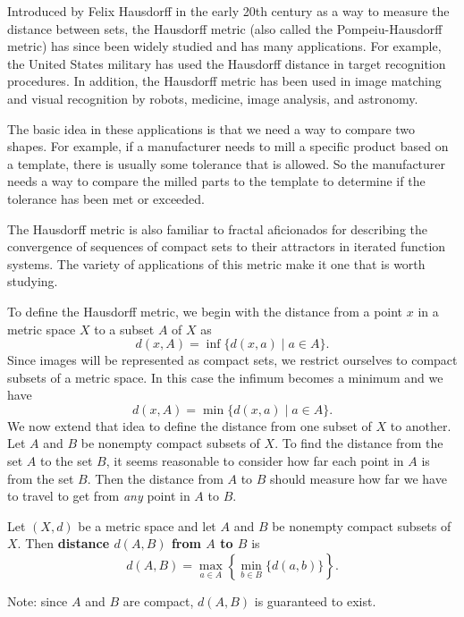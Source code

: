 \ee


Introduced by Felix Hausdorff in the early 20th century as a way to measure the distance between sets, the Hausdorff metric  (also called the Pompeiu-Hausdorff metric) has since been widely studied and has many applications. For example, the United States military has used the Hausdorff distance in target recognition procedures. In addition, the Hausdorff metric has been used in image matching and visual recognition by robots, medicine, image analysis, and astronomy.

The basic idea in these applications is that we need a way to compare two shapes. For example, if a manufacturer needs to mill a specific product based on a template, there is usually some tolerance that is allowed. So the manufacturer needs a way to compare the milled parts to the template to determine if the tolerance has been met or exceeded.  
 
The Hausdorff metric is also familiar to fractal aficionados for describing the convergence of sequences of compact sets to their attractors in iterated function systems. The variety of applications of this metric make it one that is worth studying. 

To define the Hausdorff metric, we begin with the distance from a point $x$ in a metric space $X$ to a subset $A$ of $X$ as 
\[d(x,A) = \inf\{d(x,a) \mid a \in A\}.\]
Since images will be represented as compact sets, we restrict ourselves to compact subsets of a metric space. In this case the infimum becomes a minimum and we have 
\[d(x,A) = \min\{d(x,a) \mid a \in A\}.\]
We now extend that idea to define the distance from one subset of $X$ to another. Let $A$ and $B$ be nonempty compact subsets of $X$. To find the distance from the set $A$ to the set $B$, it seems reasonable to consider how far each point in $A$ is from the set $B$. Then the distance from $A$ to $B$ should measure how far we have to travel to get from \emph{any} point in $A$ to $B$. 


\begin{definition} \label{def:AtoB} Let $(X,d)$ be a metric space and let $A$ and $B$ be nonempty compact subsets of $X$. Then \textbf{distance $d(A,B)$ from $A$ to $B$} is 
\[d(A,B) = \max_{a \in A} \left\{ \min_{b \in B} \{d(a,b)\} \right\}.\]
\end{definition}
Note: since $A$ and $B$ are compact, $d(A,B)$ is guaranteed to exist.  

